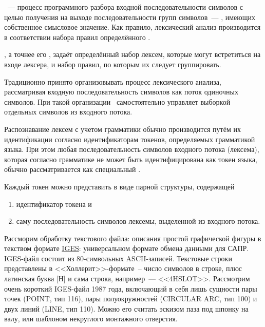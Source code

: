 \ --- процесс программного разбора входной
последовательности символов с целью получения на выходе последовательности групп
символов\ --- , имеющих собственное смысловое
значение. Как правило, лексический анализ
производится в соответствии набора правил определённого .

\begin{framed}
, а точнее его
, задаёт определённый набор лексем, которые могут встретиться
на входе лексера, и набор правил, по которым их следует группировать.
\end{framed}

Традиционно принято организовывать процесс лексического анализа, рассматривая
входную последовательность символов как поток одиночных символов. При такой
организации \ самостоятельно управляет выборкой отдельных символов
из входного потока.

Распознавание лексем с учетом грамматики обычно производится путём их
идентификации согласно идентификаторам токенов, определяемых грамматикой языка.
При этом любая последовательность символов входного потока (лексема), которая
согласно грамматике не может быть идентифицирована как токен языка, обычно
рассматривается как специальный .

\bigskip
Каждый  токен можно представить в виде парной структуры,
содержащей
\begin{enumerate}
  \item идентификатор токена и
  \item саму последовательность символов лексемы, выделенной из входного
потока.
\end{enumerate}

\bigskip
Рассморим обработку текстового файла: описания простой графической фигуры в
текством формате \href{https://ru.wikipedia.org/wiki/IGES}{IGES}: универсальном
формате обмена данными для САПР. IGES-файл состоит из 80-символьных
ASCII-записей. Текстовые строки представлены в
<<Холлерит>>-формате\ -- число символов в строке, плюс латинская буква [Н] и
сама строка, например\ --- <<4HSLOT>>. Рассмотрим  очень короткий IGES-файл 1987
года, включающий в себя лишь сущности пары точек (POINT, тип 116), пары
полуокружностей (CIRCULAR ARC, тип 100) и двух линий (LINE, тип 110). Можно его
считать эскизом паза под шпонку на валу, или шаблоном некруглого монтажного
отверстия.

